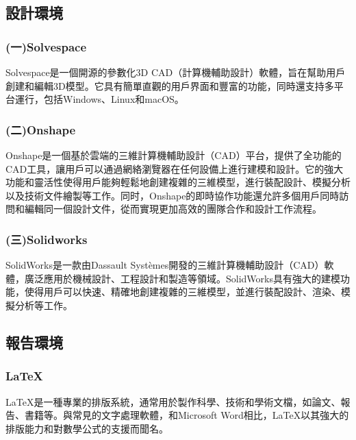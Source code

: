 \subsection{設計環境}
\subsubsection{(一)Solvespace}
\fontsize{14pt}{2.5pt}\sectionef\hspace{12pt}
Solvespace是一個開源的參數化3D CAD（計算機輔助設計）軟體，旨在幫助用戶創建和編輯3D模型。它具有簡單直觀的用戶界面和豐富的功能，同時還支持多平台運行，包括Windows、Linux和macOS。\\
\subsubsection{(二)Onshape}
\fontsize{14pt}{2.5pt}\sectionef\hspace{12pt}
Onshape是一個基於雲端的三維計算機輔助設計（CAD）平台，提供了全功能的CAD工具，讓用戶可以通過網絡瀏覽器在任何設備上進行建模和設計。它的強大功能和靈活性使得用戶能夠輕鬆地創建複雜的三維模型，進行裝配設計、模擬分析以及技術文件繪製等工作。同时，Onshape的即時協作功能還允許多個用戶同時訪問和編輯同一個設計文件，從而實現更加高效的團隊合作和設計工作流程。\\
\subsubsection{(三)Solidworks}
\fontsize{14pt}{2.5pt}\sectionef\hspace{12pt}
SolidWorks是一款由Dassault Systèmes開發的三維計算機輔助設計（CAD）軟體，廣泛應用於機械設計、工程設計和製造等領域。SolidWorks具有強大的建模功能，使得用戶可以快速、精確地創建複雜的三維模型，並進行裝配設計、渲染、模擬分析等工作。\\
\subsection{報告環境}
\fontsize{14pt}{2.5pt}\sectionef\hspace{12pt}
\subsubsection{LaTeX}
\fontsize{14pt}{2.5pt}\sectionef\hspace{12pt}
LaTeX是一種專業的排版系統，通常用於製作科學、技術和學術文檔，如論文、報告、書籍等。與常見的文字處理軟體，和Microsoft Word相比，LaTeX以其強大的排版能力和對數學公式的支援而聞名。

\newpage

\renewcommand{\baselinestretch}{0.5} %